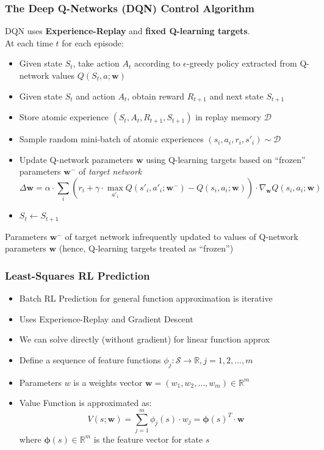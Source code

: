 \documentclass[handout]{beamer}
\begin{document}
\begin{frame}
\frametitle{The Deep Q-Networks (DQN) Control Algorithm}
\pause
DQN uses {\bf Experience-Replay} and {\bf fixed Q-learning targets}.\\
\pause
At each time $t$ for each episode:
\begin{itemize}[<+->]
\item Given state $S_t$, take action $A_t$ according to $\epsilon$-greedy policy extracted from Q-network values $Q(S_t,a;\bm{w})$
\item Given state $S_t$ and action $A_t$, obtain reward $R_{t+1}$ and next state $S_{t+1}$
\item Store atomic experience $(S_t, A_t, R_{t+1}, S_{t+1})$ in replay memory $\mathcal{D}$
\item Sample random mini-batch  of atomic experiences $(s_i,a_i,r_i,s'_i) \sim \mathcal{D}$
\item Update Q-network parameters $\bm{w}$ using Q-learning targets based on ``frozen'' parameters $\bm{w}^-$ of {\em target network}
$$\Delta \bm{w} = \alpha \cdot \sum_i (r_i + \gamma \cdot \max_{a'_i} Q(s'_i, a'_i; \bm{w}^-) - Q(s_i,a_i;\bm{w})) \cdot \nabla_{\bm{w}} Q(s_i,a_i;\bm{w})$$ 
\item $S_t \leftarrow S_{t+1}$
\end{itemize}
\pause
Parameters $\bm{w}^-$ of target network infrequently updated to values of Q-network parameters $\bm{w}$ (hence, Q-learning targets treated as ``frozen'')
\end{frame}

\begin{frame}
\frametitle{Least-Squares RL Prediction}
\pause
\begin{itemize}[<+->]
\item Batch RL Prediction for general function approximation is iterative
\item Uses Experience-Replay and Gradient Descent
\item We can solve directly (without gradient) for linear function approx
\item Define a sequence of feature functions $\phi_j: \mathcal{S} \rightarrow \mathbb{R}, j = 1, 2, \ldots, m$
\item Parameters $w$ is a weights vector $\bm{w} = (w_1, w_2, \ldots, w_m) \in \mathbb{R}^m$
\item Value Function is approximated as:
$$V(s;\bm{w}) = \sum_{j=1}^m \phi_j(s) \cdot w_j = \bm{\phi}(s)^T \cdot \bm{w}$$
where $\bm{\phi}(s) \in \mathbb{R}^m$ is the feature vector for state $s$
\end{itemize}
\end{frame}
\end{document}
